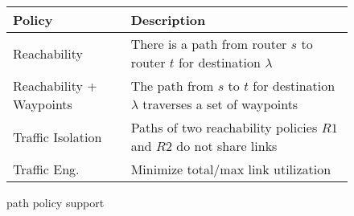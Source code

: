 \begin{wrapfigure}{r}{0.53\textwidth}
\vspace{-2mm}
\small
\begin{minipage}{\linewidth}
	\begin{tabular}{m{5.8em}  m{14em} } 
		{\bf Policy} & {\bf Description} \\ 
		\hline
		Reachability & There is a path from router $s$ to router $t$ for destination $\lambda$ \\ \hline
		Reachability + \newline Waypoints & The path  from $s$ to $t$ for destination $\lambda$ 
		traverses a set of waypoints\\ \hline
		Traffic \newline Isolation & Paths of two reachability policies $R1$ and $R2$ do not share  links \\ \hline
		Traffic  Eng.  & Minimize total/max link utilization \\
	\end{tabular}
	\end{minipage}
	\vspace{-1mm}
\caption{\name path policy support}
	\label{tab:policysupport}
\end{wrapfigure}